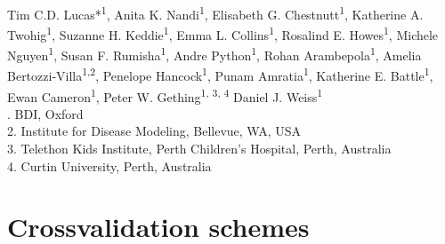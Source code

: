 \documentclass[10pt,a4]{article}
\begin{document}
\vspace*{0.2in}

\begin{flushleft}
{\Large
\textbf{} %
}
\newline
\\
Tim C.D. Lucas*\textsuperscript{1}, 
Anita K. Nandi\textsuperscript{1},
Elisabeth G. Chestnutt\textsuperscript{1},
Katherine A. Twohig\textsuperscript{1},
Suzanne H. Keddie\textsuperscript{1},
Emma L. Collins\textsuperscript{1},
Rosalind E. Howes\textsuperscript{1},
Michele Nguyen\textsuperscript{1},
Susan F. Rumisha\textsuperscript{1},
Andre Python\textsuperscript{1},
Rohan Arambepola\textsuperscript{1},
Amelia Bertozzi-Villa\textsuperscript{1,2},
Penelope Hancock\textsuperscript{1},
Punam Amratia\textsuperscript{1},
Katherine E. Battle\textsuperscript{1},
Ewan Cameron\textsuperscript{1},
Peter W. Gething\textsuperscript{1, 3, 4}
Daniel J. Weiss\textsuperscript{1}
\\
. BDI, Oxford\\
2. Institute for Disease Modeling, Bellevue, WA, USA\\
3. Telethon Kids Institute, Perth Children’s Hospital, Perth, Australia\\
4. Curtin University, Perth, Australia
\\
\bigskip

\end{flushleft}

\tableofcontents


% 
%

\clearpage
\section{Crossvalidation schemes}
\end{document}
